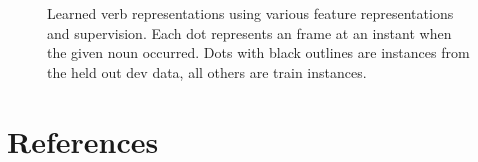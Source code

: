 \documentclass[11pt]{article}
\begin{document}
\begin{figure}[ht!]
%
%
\caption{Learned verb representations using various feature representations and supervision. Each dot represents an frame at an instant when the given noun occurred. Dots with black outlines are instances from the held out dev data, all others are train instances.}
\label{fig:verb-clusters}
\end{figure}

\section*{References}
 

 
 
\end{document}
